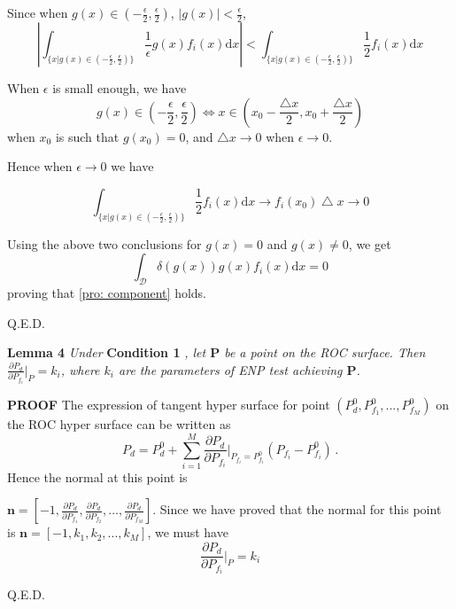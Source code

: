 Since when $g(x) \in (-\frac{\epsilon}{2}, \frac{\epsilon}{2})$, $|g(x)| < \frac{\epsilon}{2}$,
\begin{equation}|
\int_{\{x|g(x)\in (-\frac{\epsilon}{2}, \frac{\epsilon}{2})\}} \frac{1}{\epsilon} g(x)f_i(x) \mathrm{d}x | <
\int_{\{x|g(x)\in (-\frac{\epsilon}{2}, \frac{\epsilon}{2})\}} \frac{1}{2}f_i(x) \mathrm{d}x
\end{equation}

When $\epsilon$ is small enough, we have 
\[
  g(x) \in (-\frac{\epsilon}{2}, \frac{\epsilon}{2}) \Leftrightarrow  x \in (x_0 - \frac{\triangle x}{2}, x_0 + \frac{\triangle x}{2})
\]
when $x_0 $ is such that $g(x_0) = 0$, and $\triangle x \rightarrow 0$ when $\epsilon \rightarrow 0$. 

Hence when $\epsilon \rightarrow 0$ we have 

\def \LEFT{ x_s
  -\left(\frac{n!\varepsilon}{2|g^{(n)}(x_s)|}\right)^{\frac{1}{n}}}
  \def \RIGHT{ x_s
  +\left(\frac{n!\varepsilon}{2|g^{(n)}(x_s)|}\right)^{\frac{1}{n}}}
\begin{equation}
\int_{\{x|g(x)\in (-\frac{\epsilon}{2}, \frac{\epsilon}{2})\}} \frac{1}{2}f_i(x) \mathrm{d}x \rightarrow
f_i(x_0)\bigtriangleup x \rightarrow 0
\end{equation}

Using the above two conclusions for $g(x) = 0$ and $g(x) \neq 0$, we get
\begin{equation}
\int_{\mathcal{D}} \delta (g(x)) g(x)f_i(x) \mathrm{d}x = 0
\end{equation}
proving that \eqref{pro: component} holds.

Q.E.D.

\noindent \textbf{Lemma 4}
\textit{
\noindent
Under}
\textbf{Condition 1}
\textit{, let $\mathbf{P}$ be a point on the ROC surface. Then $\frac{\partial P_d}{\partial P_{f_i}} \bigg|_P = k_i$, where $k_i$ are the parameters of ENP test achieving $\mathbf{P}$.
}

\noindent\textbf{PROOF}
The expression of tangent hyper surface for point $(P_d^0, P_{f_1}^0, ..., P_{f_M}^0)$ on the ROC hyper surface can be written as
\begin{equation}
P_d = P_d^0 + \sum_{i=1}^{M} \frac{\partial P_d}{\partial P_{f_i}}\bigg|_{P_{f_i} = P_{f_i}^0}(P_{f_i} - P_{f_i}^0)\,.
\end{equation}
Hence the normal at this point is

 $\mathbf{n} = [-1, \frac{\partial P_d}{\partial P_{f_1}}, \frac{\partial P_d}{\partial P_{f_2}}, ..., \frac{\partial P_d}{\partial P_{f_M}}]$. Since we have proved that  the normal for this point is $\mathbf{n} = [-1, k_1, k_2, ..., k_M]$, we must have
\begin{equation}
\frac{\partial P_d}{\partial P_{f_i}}\bigg|_{P} = k_i
\end{equation}

Q.E.D.
